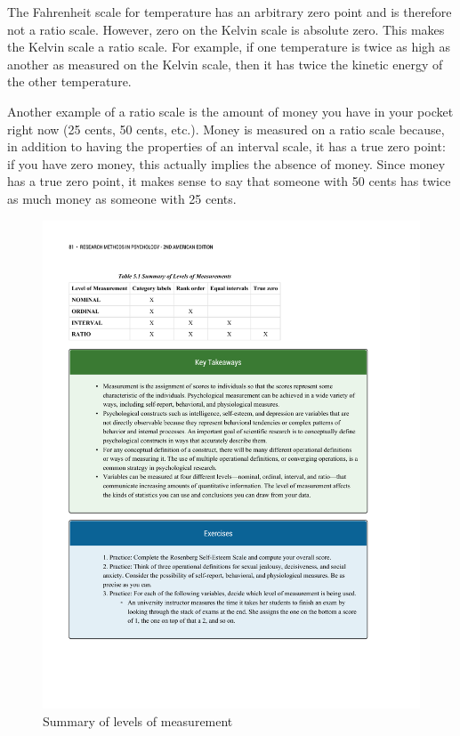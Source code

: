 The Fahrenheit scale for temperature has an arbitrary zero point and is therefore not a ratio scale. However, zero on the Kelvin scale is absolute zero. This makes the Kelvin scale a ratio scale. For example, if one temperature is twice as high as another as measured on the Kelvin scale, then it has twice the kinetic energy of the other temperature.

Another example of a ratio scale is the amount of money you have in your pocket right now (25 cents, 50 cents, etc.). Money is measured on a ratio scale because, in addition to having the properties of an interval scale, it has a true zero point: if you have zero money, this actually implies the absence of money. Since money has a true zero point, it makes sense to say that someone with 50 cents has twice as much money as someone with 25 cents.

\begin{figure}

      \includegraphics[width=\linewidth]{figures/C5Mscales.pdf}
      \caption{Summary of levels of measurement}
      \label{fig:scales}
\end{figure}


